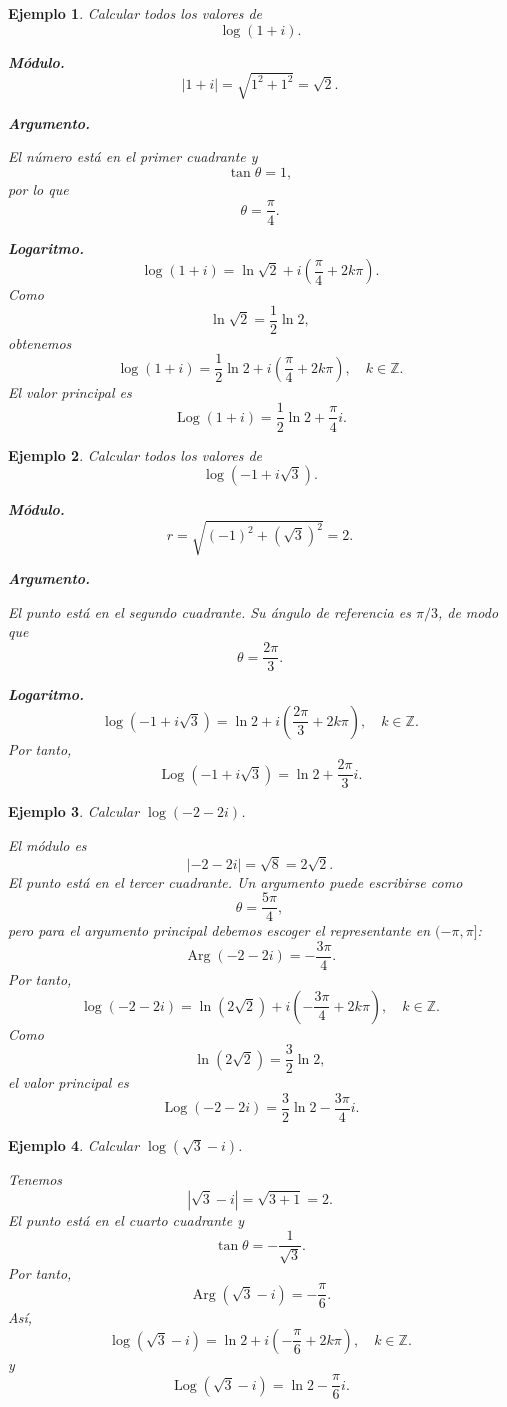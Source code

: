 \documentclass[12pt]{article}
\newtheorem{ejemplo}{Ejemplo}[section]
\begin{document}
\begin{ejemplo}
Calcular todos los valores de
\[
\log(1+i).
\]

\textbf{Módulo.}
\[
|1+i|=\sqrt{1^2+1^2}=\sqrt2.
\]

\textbf{Argumento.}

El número está en el primer cuadrante y
\[
\tan\theta=1,
\]
por lo que
\[
\theta=\frac{\pi}{4}.
\]

\textbf{Logaritmo.}
\[
\log(1+i)
=
\ln\sqrt2
+i\left(\frac{\pi}{4}+2k\pi\right).
\]
Como
\[
\ln\sqrt2=\frac12\ln2,
\]
obtenemos
\[
\boxed{
\log(1+i)
=
\frac12\ln2
+i\left(\frac{\pi}{4}+2k\pi\right),
\quad k\in\mathbb Z.
}
\]
El valor principal es
\[
\boxed{
\operatorname{Log}(1+i)
=
\frac12\ln2+\frac{\pi}{4}i.
}
\]
\end{ejemplo}

\begin{ejemplo}
Calcular todos los valores de
\[
\log(-1+i\sqrt3).
\]

\textbf{Módulo.}
\[
r=\sqrt{(-1)^2+(\sqrt3)^2}=2.
\]

\textbf{Argumento.}

El punto está en el segundo cuadrante. Su ángulo de referencia es $\pi/3$,
de modo que
\[
\theta=\frac{2\pi}{3}.
\]

\textbf{Logaritmo.}
\[
\boxed{
\log(-1+i\sqrt3)
=
\ln2+i\left(\frac{2\pi}{3}+2k\pi\right),
\quad k\in\mathbb Z.
}
\]
Por tanto,
\[
\boxed{
\operatorname{Log}(-1+i\sqrt3)
=
\ln2+\frac{2\pi}{3}i.
}
\]
\end{ejemplo}

\begin{ejemplo}
Calcular $\log(-2-2i)$.

El módulo es
\[
|-2-2i|=\sqrt8=2\sqrt2.
\]
El punto está en el tercer cuadrante. Un argumento puede escribirse como
\[
\theta=\frac{5\pi}{4},
\]
pero para el argumento principal debemos escoger el representante en
$(-\pi,\pi]$:
\[
\operatorname{Arg}(-2-2i)=-\frac{3\pi}{4}.
\]
Por tanto,
\[
\boxed{
\log(-2-2i)
=
\ln(2\sqrt2)
+i\left(-\frac{3\pi}{4}+2k\pi\right),
\quad k\in\mathbb Z.
}
\]
Como
\[
\ln(2\sqrt2)=\frac32\ln2,
\]
el valor principal es
\[
\boxed{
\operatorname{Log}(-2-2i)
=
\frac32\ln2-\frac{3\pi}{4}i.
}
\]
\end{ejemplo}

\begin{ejemplo}
Calcular $\log(\sqrt3-i)$.

Tenemos
\[
|\sqrt3-i|=\sqrt{3+1}=2.
\]
El punto está en el cuarto cuadrante y
\[
\tan\theta=-\frac{1}{\sqrt3}.
\]
Por tanto,
\[
\operatorname{Arg}(\sqrt3-i)=-\frac{\pi}{6}.
\]
Así,
\[
\boxed{
\log(\sqrt3-i)
=
\ln2+i\left(-\frac{\pi}{6}+2k\pi\right),
\quad k\in\mathbb Z.
}
\]
y
\[
\boxed{
\operatorname{Log}(\sqrt3-i)=\ln2-\frac{\pi}{6}i.
}
\]
\end{ejemplo}
\end{document}
